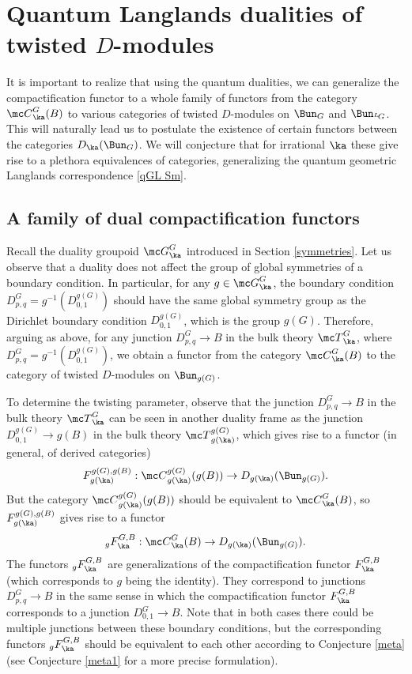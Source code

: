 \documentclass[11pt,reqno]{amsart}
\theoremstyle{plain}
\numberwithin{equation}{section}
\def\neg{\negthinspace}
\def\LG{{}^L\neg G}
\theoremstyle{definition}
\begin{document}
\section{Quantum Langlands dualities of twisted
  $D$-modules}    \label{qGL dual}

It is important to realize that using the quantum dualities, we can
generalize the compactification functor to a whole family of functors
from the category ${\mc C}^G_\ka(B)$ to various categories of twisted
$D$-modules on $\Bun_G$ and $\Bun_{\LG}$. This will naturally lead us
to postulate the existence of certain functors between the categories
$D_\ka(\Bun_G)$. We will conjecture that for irrational $\ka$ these give
rise to a plethora equivalences of categories, generalizing the
quantum geometric Langlands correspondence \eqref{qGL Sm}.

\subsection{A family of dual compactification functors}

Recall the duality groupoid ${\mc G}^G_\ka$ introduced in Section
\ref{symmetries}. Let us observe that a duality does not affect the
group of global symmetries of a boundary condition. In particular, for
any $g \in {\mc G}^G_\ka$, the boundary condition $D^G_{p,q} =
g^{-1}(D^{g(G)}_{0,1})$ should have the same global symmetry group as
the Dirichlet boundary condition $D^{g(G)}_{0,1}$, which is the group
$g(G)$. Therefore, arguing as above, for any junction $D^G_{p,q} \to
B$ in the bulk theory ${\mc T}^G_\ka$, where $D^G_{p,q} =
g^{-1}(D^{g(G)}_{0,1})$, we obtain a functor from the category ${\mc
  C}^G_\ka(B)$ to the category of twisted $D$-modules on
$\Bun_{g(G)}$.

To determine the twisting parameter, observe that the junction
$D^G_{p,q} \to B$ in the bulk theory ${\mc T}^G_\ka$ can be seen in
another duality frame as the junction $D^{g(G)}_{0,1} \to g(B)$ in the
bulk theory ${\mc T}^{g(G)}_{g(\ka)}$, which gives rise to a functor
(in general, of derived categories)
\begin{equation}    \label{FgG}
F^{g(G),g(B)}_{g(\ka)}: {\mc C}^{g(G)}_{g(\ka)}(g(B)) \to
D_{g(\ka)}(\Bun_{g(G)}).
\end{equation}
But the category ${\mc C}^{g(G)}_{g(\ka)}(g(B))$ should be equivalent
to ${\mc C}^G_\ka(B)$, so $F^{g(G),g(B)}_{g(\ka)}$ gives rise to a
functor
\begin{equation}    \label{gFG}
_g F^{G,B}_\ka: {\mc C}^G_\ka(B) \to D_{g(\ka)}(\Bun_{g(G)}).
\end{equation}
The functors $_g F^{G,B}_\ka$ are generalizations of the
compactification functor $F^{G,B}_\ka$ (which corresponds to $g$ being
the identity). They correspond to junctions $D^G_{p,q} \to B$ in the
same sense in which the compactification functor $F^{G,B}_\ka$
corresponds to a junction $D^G_{0,1} \to B$. Note that in both cases
there could be multiple junctions between these boundary conditions,
but the corresponding functors $_g F^{G,B}_\ka$ should be equivalent
to each other according to Conjecture \ref{meta} (see Conjecture
\ref{meta1} for a more precise formulation).
\end{document}
